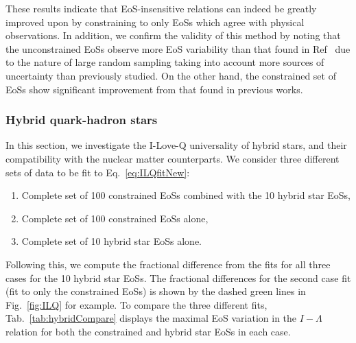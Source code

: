 \documentclass[prd,twocolumn,nofootinbib,superscriptaddress,amsmath,amssymb]{revtex4-1}
\begin{document}
These results indicate that EoS-insensitive relations can indeed be greatly improved upon by constraining to only EoSs which agree with physical observations.
In addition, we confirm the validity of this method by noting that the unconstrained EoSs observe more EoS variability than that found in Ref~\cite{Yagi:ILQ} due to the nature of large random sampling taking into account more sources of uncertainty than previously studied.
On the other hand, the constrained set of EoSs show significant improvement from that found in previous works.

\subsubsection{Hybrid quark-hadron stars}\label{sec:ilq-hyb}
In this section, we investigate the I-Love-Q universality of hybrid stars, and their compatibility with the nuclear matter counterparts.
We consider three different sets of data to be fit to Eq.~\ref{eq:ILQfitNew}:
\begin{enumerate}
\item Complete set of 100 constrained EoSs combined with the 10 hybrid star EoSs,
\item Complete set of 100 constrained EoSs alone,
\item Complete set of 10 hybrid star EoSs alone.
\end{enumerate}
Following this, we compute the fractional difference from the fits for all three cases for the 10 hybrid star EoSs.
The fractional differences for the second case fit (fit to only the constrained EoSs) is shown by the dashed green lines in Fig.~\ref{fig:ILQ} for example.
To compare the three different fits, Tab.~\ref{tab:hybridCompare} displays the maximal EoS variation in the $I-\Lambda$ relation for both the constrained and hybrid star EoSs in each case.
\end{document}
